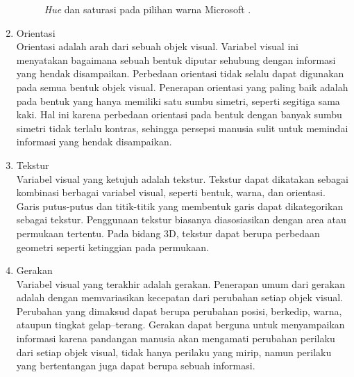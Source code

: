 \begin{enumerate}
\begin{figure}[t!]
        \caption{\textit{Hue} dan saturasi pada pilihan warna Microsoft \cite{buku_visual}.}
        \label{fig:macam-warna}
    \end{figure}
    \item Orientasi \\
    Orientasi adalah arah dari sebuah objek visual. Variabel visual ini menyatakan bagaimana sebuah bentuk diputar sehubung dengan informasi yang hendak disampaikan. Perbedaan orientasi tidak selalu dapat digunakan pada semua bentuk objek visual. Penerapan orientasi yang paling baik adalah pada bentuk yang hanya memiliki satu sumbu simetri, seperti segitiga sama kaki. Hal ini karena perbedaan orientasi pada bentuk dengan banyak sumbu simetri tidak terlalu kontras, sehingga persepsi manusia sulit untuk memindai informasi yang hendak disampaikan.
    \item Tekstur \\
    Variabel visual yang ketujuh adalah tekstur. Tekstur dapat dikatakan sebagai kombinasi berbagai variabel visual, seperti bentuk, warna, dan orientasi. Garis putus-putus dan titik-titik yang membentuk garis dapat dikategorikan sebagai tekstur. Penggunaan tekstur biasanya diasosiasikan dengan area atau permukaan tertentu. Pada bidang 3D, tekstur dapat berupa perbedaan geometri seperti ketinggian pada permukaan.
    \item Gerakan \\
    Variabel visual yang terakhir adalah gerakan. Penerapan umum dari gerakan adalah dengan memvariasikan kecepatan dari perubahan setiap objek visual. Perubahan yang dimaksud dapat berupa perubahan posisi, berkedip, warna, ataupun tingkat gelap–terang. Gerakan dapat berguna untuk menyampaikan informasi karena pandangan manusia akan mengamati perubahan perilaku dari setiap objek visual, tidak hanya perilaku yang mirip, namun perilaku yang bertentangan juga dapat berupa sebuah informasi. 
\end{enumerate}
